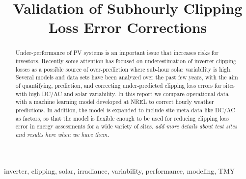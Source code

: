 \documentclass[conference]{IEEEtran}
\begin{document}
\title{Validation of Subhourly Clipping Loss Error Corrections}

\author{
    }

\maketitle

\begin{abstract}
Under-performance of PV systems is an important issue that increases risks for investors. Recently some attention has focused on underestimation of inverter clipping losses as a possible source of over-prediction where sub-hour solar variability is high. Several models and data sets have been analyzed over the past few years, with the aim of quantifying, prediction, and correcting under-predicted clipping loss errors for sites with high DC/AC and solar variability. In this report we compare operational data with a machine learning model developed at NREL to correct hourly weather predictions. In addition, the model is expanded to include site meta-data like DC/AC as factors, so that the model is flexible enough to be used for reducing clipping loss error in energy assessments for a wide variety of sites. \textit{\color{red}add more details about test sites and results here when we have them.}
\end{abstract}

\begin{IEEEkeywords}
inverter, clipping, solar, irradiance, variability, performance, modeling, TMY
\end{IEEEkeywords}
\end{document}
